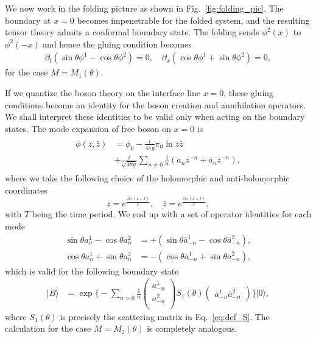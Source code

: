 We now work in the folding picture as shown in Fig.~\ref{fig:folding_pic}. The boundary at $x=0$ becomes impenetrable for the folded system, and the resulting tensor theory admits a conformal boundary state. The folding sends $\phi^2(x)$ to $\phi^2(-x)$ and hence the gluing condition becomes
\begin{equation}
\begin{aligned}
\partial_t(\sin\theta\phi^1-\cos\theta\phi^2)=0, \quad
\partial_x(\cos\theta\phi^1+\sin\theta\phi^2)=0, 
\end{aligned}
\end{equation}
for the case $M = M_1(\theta)$. 

If we quantize the boson theory on the interface line $x = 0$, these gluing conditions become an identity for the boson creation and annihilation operators. We shall interpret these identities to be valid only when acting on the boundary states. The mode expansion of free boson on $x = 0$\cite{di_francesco_conformal_1997} is
\begin{eqnarray}\begin{aligned}
\phi(z, \bar{z} ) &= \phi_0 - \frac{i}{4\pi g } \pi_0 \ln z \bar{z} \\
 \quad&+ \frac{i}{\sqrt{4\pi g} } \sum_{n \ne 0 } \frac{1}{n} \left(a_n z^{-n} + \bar{a}_{n} \bar{z}^{-n}   \right),
\end{aligned}\end{eqnarray}
where we take the following choice of the holomorphic and anti-holomorphic coordinates
\begin{equation}
z= e^{ \frac{2\pi i(x - t)}{T} }, \quad \bar{z} = e^{ \frac{2\pi i( x + t  )}{T} },
\end{equation}
with $T$ being the time period. We end up with a set of operator identities for each mode
\begin{equation}
\begin{aligned}
\label{eq:rotation_a_basis}
\sin  \theta a^1_n - \cos \theta a^2_n  &= + \left( \sin  \theta \bar{a}^1_{-n} - \cos \theta \bar{a}^2_{-n} \right),\\
\cos  \theta a^1_n + \sin \theta a^2_n  &= - \left( \cos  \theta \bar{a}^1_{-n} + \sin \theta \bar{a}^2_{-n} \right), 
\end{aligned}
\end{equation}
which is valid for the following boundary state
\begin{equation}
\label{eq:bd_state}
\begin{aligned}
| B \rangle 
& =  \exp\Big\{ -\sum_{n > 0 } \frac{1}{n}
\begin{pmatrix}
a_{-n}^1\\
a_{-n}^2\\                              
\end{pmatrix}
S_1( \theta )
\begin{pmatrix}
\bar{a}_{-n}^1  \bar{a}_{-n}^2
\end{pmatrix} \Big\} |0\rangle,
\end{aligned}
\end{equation}
where $S_1(\theta) $ is precisely the scattering matrix in Eq.~\eqref{eq:def_S}. The calculation for the case $M=M_2(\theta)$ is completely analogous. 

